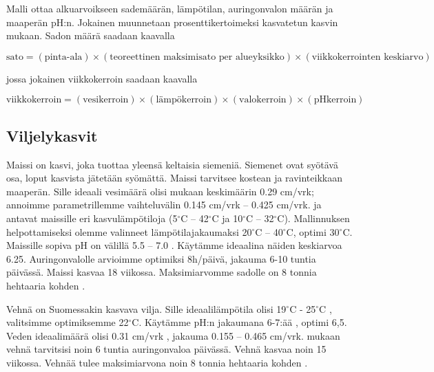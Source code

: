 \documentclass[12pt]{scrreprt}
\begin{document}
  Malli ottaa alkuarvoikseen sademäärän, lämpötilan, auringonvalon määrän ja
  maaperän pH:n. Jokainen muunnetaan prosenttikertoimeksi kasvatetun kasvin
  mukaan. Sadon määrä saadaan kaavalla

  \begin{em}
  $ \text{sato} = (\text{pinta-ala}) \times (\text{teoreettinen maksimisato per
  alueyksikko}) \times (\text{viikkokerrointen keskiarvo}) $\end{em}
  jossa jokainen viikkokerroin saadaan kaavalla

  \begin{em}
  $ \text{viikkokerroin} = (\text{vesikerroin}) \times (\text{lämpökerroin})
  \times (\text{valokerroin}) \times (\text{pHkerroin}) $\end{em}




  \subsection{Viljelykasvit}

  Maissi on kasvi, joka tuottaa yleensä keltaisia siemeniä. Siemenet ovat
  syötävä osa, loput kasvista jätetään syömättä. Maissi tarvitsee kostean ja
  ravinteikkaan maaperän. Sille ideaali vesimäärä olisi \cite{cropwater} mukaan
  keskimäärin 0.29 cm/vrk; annoimme parametrillemme vaihteluvälin 0.145 cm/vrk
  – 0.425 cm/vrk. \cite{ugandamaize} ja \cite{plessismaize} antavat maissille
  eri kasvulämpötiloja (5$^{\circ}$C – 42$^{\circ}$C ja 10$^{\circ}$C –
  32$^{\circ}$C). Mallinnuksen helpottamiseksi olemme valinneet
  lämpötilajakaumaksi 20$^{\circ}$C – 40$^{\circ}$C, optimi 30$^{\circ}$C.
  Maissille sopiva pH on välillä 5.5 – 7.0 \cite{corngrowing}. Käytämme
  ideaalina näiden keskiarvoa 6.25. Auringonvalolle arvioimme optimiksi
  8h/päivä, jakauma 6-10 tuntia päivässä. Maissi kasvaa 18 viikossa.
  Maksimiarvomme sadolle on 8 tonnia hehtaaria kohden \cite{iita}.

  Vehnä on Suomessakin kasvava vilja. Sille ideaalilämpötila olisi 19$^{\circ}$C
  - 25$^{\circ}$C \cite{wheat}, valitsimme optimiksemme 22$^{\circ}$C. Käytämme
  pH:n jakaumana 6-7:ää \cite{wheatfert}, optimi 6,5. Veden ideaalimäärä olisi
  0.31 cm/vrk \cite{cropwater}, jakauma  0.155 – 0.465 cm/vrk. \cite{growwheat}
  mukaan vehnä tarvitsisi noin 6 tuntia auringonvaloa päivässä. Vehnä kasvaa
  noin 15 viikossa. Vehnää tulee maksimiarvona noin 8 tonnia hehtaaria kohden
  \cite{sri}.
\end{document}
